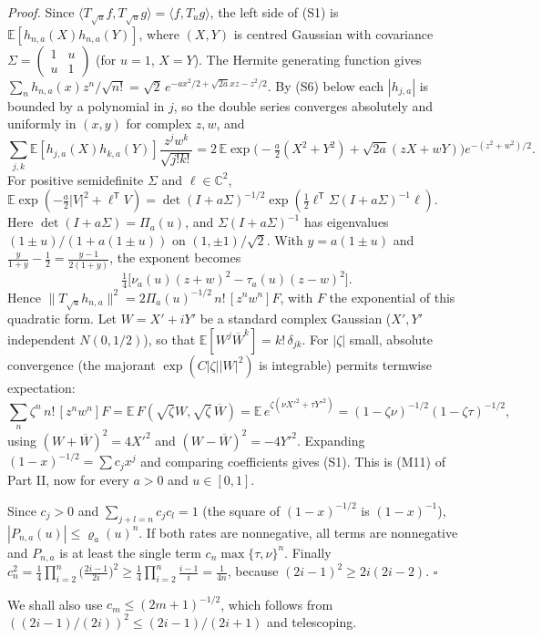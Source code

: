 \documentclass[
  british,
  10pt,
]{article}
\begin{document}
\emph{Proof.} Since
\(\langle T_{\sqrt u}f,T_{\sqrt u}g\rangle=\langle f,T_ug\rangle\), the
left side of (S1) is \(\mathbb E[h_{n,a}(X)h_{n,a}(Y)]\), where
\((X,Y)\) is centred Gaussian with covariance
\(\Sigma=\begin{pmatrix}1&u\\u&1\end{pmatrix}\) (for \(u=1\), \(X=Y\)).
The Hermite generating function gives
\(\sum_n h_{n,a}(x)z^n/\sqrt{n!}=\sqrt2\,e^{-ax^2/2+\sqrt{2a}xz-z^2/2}\).
By (S6) below each \(|h_{j,a}|\) is bounded by a polynomial in \(j\), so
the double series converges absolutely and uniformly in \((x,y)\) for
complex \(z,w\), and \[
\sum_{j,k}\mathbb E[h_{j,a}(X)h_{k,a}(Y)]\frac{z^jw^k}{\sqrt{j!k!}}
=2\,\mathbb E\exp\Big(-\tfrac a2(X^2+Y^2)+\sqrt{2a}(zX+wY)\Big)e^{-(z^2+w^2)/2}.
\] For positive semidefinite \(\Sigma\) and \(\ell\in\mathbb C^2\),
\(\mathbb E\exp(-\frac a2|V|^2+\ell^{\mathsf T}V)=\det(I+a\Sigma)^{-1/2}\exp(\frac12\ell^{\mathsf T}\Sigma(I+a\Sigma)^{-1}\ell)\).
Here \(\det(I+a\Sigma)=\Pi_a(u)\), and \(\Sigma(I+a\Sigma)^{-1}\) has
eigenvalues \((1\pm u)/(1+a(1\pm u))\) on \((1,\pm1)/\sqrt2\). With
\(y=a(1\pm u)\) and \(\frac{y}{1+y}-\frac12=\frac{y-1}{2(1+y)}\), the
exponent becomes \[
\tfrac14\big[\nu_a(u)(z+w)^2-\tau_a(u)(z-w)^2\big].
\] Hence \(\|T_{\sqrt u}h_{n,a}\|^2=2\Pi_a(u)^{-1/2}\,n!\,[z^nw^n]F\),
with \(F\) the exponential of this quadratic form. Let \(W=X'+iY'\) be a
standard complex Gaussian (\(X',Y'\) independent \(N(0,1/2)\)), so that
\(\mathbb E[W^j\overline W^k]=k!\,\delta_{jk}\). For \(|\zeta|\) small,
absolute convergence (the majorant \(\exp(C|\zeta||W|^2)\) is
integrable) permits termwise expectation: \[
\sum_n\zeta^n\,n!\,[z^nw^n]F=\mathbb E\,F(\sqrt\zeta W,\sqrt\zeta\,\overline W)
=\mathbb E\,e^{\zeta(\nu X'^2+\tau Y'^2)}
=(1-\zeta\nu)^{-1/2}(1-\zeta\tau)^{-1/2},
\] using \((W+\overline W)^2=4X'^2\) and \((W-\overline W)^2=-4Y'^2\).
Expanding \((1-x)^{-1/2}=\sum c_jx^j\) and comparing coefficients gives
(S1). This is (M11) of Part II, now for every \(a>0\) and \(u\in[0,1]\).

Since \(c_j>0\) and \(\sum_{j+l=n}c_jc_l=1\) (the square of
\((1-x)^{-1/2}\) is \((1-x)^{-1}\)), \(|P_{n,a}(u)|\le\varrho_a(u)^n\).
If both rates are nonnegative, all terms are nonnegative and \(P_{n,a}\)
is at least the single term \(c_n\max\{\tau,\nu\}^n\). Finally
\(c_n^2=\frac14\prod_{i=2}^n\big(\frac{2i-1}{2i}\big)^2\ge\frac14\prod_{i=2}^n\frac{i-1}{i}=\frac1{4n}\),
because \((2i-1)^2\ge 2i(2i-2)\). \(\square\)

We shall also use \(c_m\le(2m+1)^{-1/2}\), which follows from
\(((2i-1)/(2i))^2\le(2i-1)/(2i+1)\) and telescoping.
\end{document}
